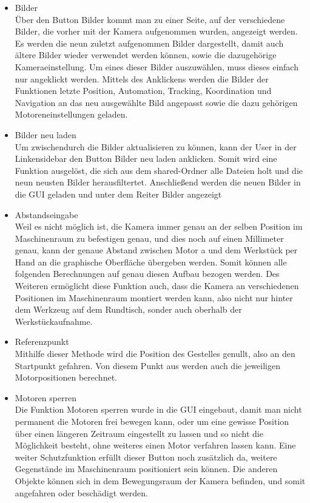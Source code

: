 \documentclass[12pt,a4paper,bibliography=totocnumbered,listof=totocnumbered]{scrartcl}
\begin{document}
\begin{itemize}
\begin{itemize}
\item Bilder\\ 
Über den Button Bilder kommt man zu einer Seite, auf der verschiedene Bilder, die vorher mit der Kamera aufgenommen wurden, angezeigt werden. Es werden die neun zuletzt aufgenommen Bilder dargestellt, damit auch ältere Bilder wieder verwendet werden können, sowie die dazugehörige Kameraeinstellung. Um eines dieser Bilder auszuwählen, muss dieses einfach nur angeklickt werden. Mittels des Anklickens werden die Bilder der Funktionen letzte Position, Automation, Tracking, Koordination und  Navigation an das neu ausgewählte Bild angepasst sowie die dazu gehörigen Motoreneinstellungen geladen.
\item Bilder neu laden\\
Um zwischendurch die Bilder aktualisieren zu können, kann der User in der Linkensidebar den Button \glqq Bilder neu laden\grqq{} anklicken. Somit wird eine Funktion ausgelöst, die sich aus dem \glqq shared-Ordner\grqq{} alle Dateien holt und die neun neusten Bilder herausfiltertet. Anschließend werden die neuen Bilder in die GUI geladen und unter dem Reiter Bilder angezeigt
\item Abstandseingabe\\ 
Weil es nicht möglich ist, die Kamera immer genau an der selben Position  im Maschinenraum zu befestigen genau, und dies noch auf einen Millimeter genau, kann der genaue Abstand zwischen Motor a und dem Werkstück per Hand an die graphische Oberfläche übergeben werden. Somit können alle folgenden Berechnungen auf genau diesen Aufbau bezogen werden. Des Weiteren ermöglicht diese Funktion auch, dass die Kamera an verschiedenen Positionen im Maschinenraum montiert werden kann, also nicht nur hinter dem Werkzeug auf dem Rundtisch, sonder auch oberhalb der Werkstückaufnahme.
\item Referenzpunkt\\
Mithilfe dieser Methode wird die Position des Gestelles genullt, also an den Startpunkt gefahren. Von diesem Punkt aus werden auch die jeweiligen Motorpositionen berechnet.
\item Motoren sperren\\
Die Funktion Motoren sperren wurde in die GUI eingebaut, damit man nicht permanent die Motoren frei bewegen kann, oder um eine gewisse Position über einen längeren Zeitraum eingestellt zu lassen und so nicht die Möglichkeit besteht, ohne weiteres einen Motor verfahren lassen kann. Eine weiter Schutzfunktion erfüllt dieser Button noch zusätzlich da, weitere Gegenstände im Maschinenraum positioniert sein können. Die anderen Objekte können  sich in dem Bewegungsraum der Kamera befinden, und somit angefahren oder beschädigt werden.

\end{itemize}
\end{itemize}
\end{document}
